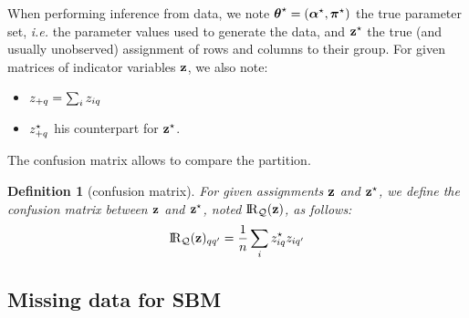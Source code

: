 \documentclass[]{imsart}
\newcommand{\1}{\mathds{1}}
\numberwithin{equation}{section}
\theoremstyle{plain}
\newtheorem{dof}[thm]{Definition}
\theoremstyle{remark}
\begin{document}
When performing inference from data, we note $\boldsymbol{\theta}^\star = (\boldsymbol{\alpha}^\star, \boldsymbol{\pi}^\star)$ the true parameter set, \emph{i.e.} the parameter values used to generate the data, and $\mathbf{z}^\star$ the true (and usually unobserved) assignment of rows and columns to their group.
For given matrices of indicator variables $\mathbf{z}$, we also note:
\begin{itemize}
\item $z_{+q} = \sum_{i} z_{iq}$ 
\item $z^{\star}_{+q}$ his counterpart for $\mathbf{z}^\star$.
\end{itemize}
The confusion matrix allows to compare the partition.
\begin{dof}[confusion matrix]
  \label{def:confusion}
  For given assignments $\mathbf{z}$ and $\mathbf{z}^\star$, we define the \emph{confusion matrix} between $\mathbf{z}$ and $\mathbf{z}^\star$, noted $\RQbz$, as follows:
  \begin{equation}
    \label{eq:confusion-matrix}
    \RQbz_{q q^{\prime}} = \frac{1}{\n} \sum_{\ii} \z^\vrai_{\ii q} \z_{\ii q^{\prime}}
  \end{equation}
\end{dof}


\subsection{Missing data for SBM}
\end{document}
